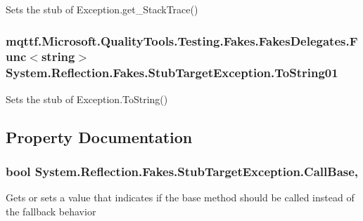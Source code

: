 Sets the stub of Exception.\-get\-\_\-\-Stack\-Trace()

\hypertarget{class_system_1_1_reflection_1_1_fakes_1_1_stub_target_exception_a3169dfe123baf54a806ca8ae0cc76eba}{
\subsubsection[{To\-String01}]{\setlength{\rightskip}{0pt plus 5cm}mqttf.\-Microsoft.\-Quality\-Tools.\-Testing.\-Fakes.\-Fakes\-Delegates.\-Func$<$string$>$ System.\-Reflection.\-Fakes.\-Stub\-Target\-Exception.\-To\-String01}}\label{class_system_1_1_reflection_1_1_fakes_1_1_stub_target_exception_a3169dfe123baf54a806ca8ae0cc76eba}


Sets the stub of Exception.\-To\-String()



\subsection{Property Documentation}
\hypertarget{class_system_1_1_reflection_1_1_fakes_1_1_stub_target_exception_aea65628e5d305d9a7bb2f6e78f53a3b9}{
\subsubsection[{Call\-Base}]{\setlength{\rightskip}{0pt plus 5cm}bool System.\-Reflection.\-Fakes.\-Stub\-Target\-Exception.\-Call\-Base\hspace{0.3cm}{\ttfamily [get]}, {\ttfamily [set]}}}\label{class_system_1_1_reflection_1_1_fakes_1_1_stub_target_exception_aea65628e5d305d9a7bb2f6e78f53a3b9}


Gets or sets a value that indicates if the base method should be called instead of the fallback behavior

